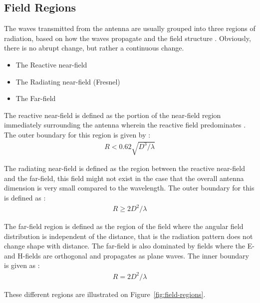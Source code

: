 \subsection{Field Regions}
The waves transmitted from the antenna are usually grouped into three regions of radiation, based on how the waves propagate and the field structure \cite{balanis2012antenna}. Obviously, there is no abrupt change, but rather a continuous change.
\begin{itemize}
\item The Reactive near-field 
\item The Radiating near-field (Fresnel)
\item The Far-field
\end{itemize}

The reactive near-field is defined as the portion of the near-field region immediately surrounding the antenna wherein the reactive field predominates \cite{balanis2012antenna}. The outer boundary for this region is given by \cite{balanis2012antenna}:
\begin{align}
  R < 0.62 \sqrt{D^3/\lambda}
\end{align}

The radiating near-field is defined as the region between the reactive near-field and the far-field, this field might not exist in the case that the overall antenna dimension is very small compared to the wavelength. The outer boundary for this is defined as \cite{balanis2012antenna}:
\begin{align}
  R \geq 2D^2/\lambda
\end{align}

The far-field region is defined as the region of the field where the angular field distribution is independent of the distance, that is the radiation pattern does not change shape with distance. The far-field is also dominated by fields where the E- and H-fields are orthogonal and propagates as plane waves. The inner boundary is given as \cite{balanis2012antenna}:
\begin{align}
  R = 2D^2/\lambda
\end{align}

These different regions are illustrated on Figure~\ref{fig:field-regions}. 

